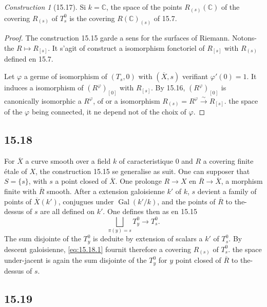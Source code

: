 \documentclass[12pt,a4paper]{article}
\theoremstyle{plain}
\theoremstyle{definition}
\theoremstyle{remark}
\newtheorem{construction}[theorem]{Construction}
\DeclareMathOperator{\Gal}{Gal}
\newcommand{\bC}{\mathbb{C}}
\begin{document}
\begin{construction}[15.17]
Si $k = \bC$, the space of the points $R_{(s)}(\bC)$ of the covering $R_{(s)}$ of $T_s^0$ is the covering $R(\bC)_{(s)}$ of 15.7.
\end{construction}

\begin{proof}
The construction 15.15 garde a sens for the surfaces of Riemann. Notons-the $R \mapsto R_{[s]}$. It s'agit of construct a isomorphism fonctoriel of $R_{[s]}$ with $R_{(s)}$ defined en 15.7.

Let $\varphi$ a germe of isomorphism of $(T_s, 0)$ with $(\overline{X}, s)$ verifiant $\varphi'(0) = 1$. It induces a isomorphism of $(R^\varphi)_{[0]}$ with $R_{[s]}$. By 15.16, $(R^\varphi)_{[0]}$ is canonically isomorphic a $R^\varphi$, of or a isomorphism $R_{(s)} = R^\varphi \xrightarrow{\sim} R_{[s]}$. the space of the $\varphi$ being connected, it ne depend not of the choix of $\varphi$.
\end{proof}

\subsection*{15.18}

For $\overline{X}$ a curve smooth over a field $k$ of caracteristique $0$ and $R$ a covering finite étale of $X$, the construction 15.15 se generalise as suit. One can supposer that $S = \{s\}$, with $s$ a point closed of $\overline{X}$. One prolonge $R \to X$ en $\overline{R} \to \overline{X}$, a morphism finite with $\overline{R}$ smooth. After a extension galoisienne $k'$ of $k$, $s$ devient a family of points of $\overline{X}(k')$, conjugues under $\Gal(k'/k)$, and the points of $\overline{R}$ to the-dessus of $s$ are all defined on $k'$. One defines then as en 15.15
\begin{equation}\label{eq:15.18.1}
\bigsqcup_{\pi(y) = s} T_y^0 \to T_s^0.
\end{equation}
The sum disjointe of the $T_y^0$ is deduite by extension of scalars a $k'$ of $T_s^0$. By descent galoisienne, \eqref{eq:15.18.1} fournit therefore a covering $R_{(s)}$ of $T_s^0$. the space under-jacent is again the sum disjointe of the $T_y^0$ for $y$ point closed of $\overline{R}$ to the-dessus of $s$.

\subsection*{15.19}
\end{document}
